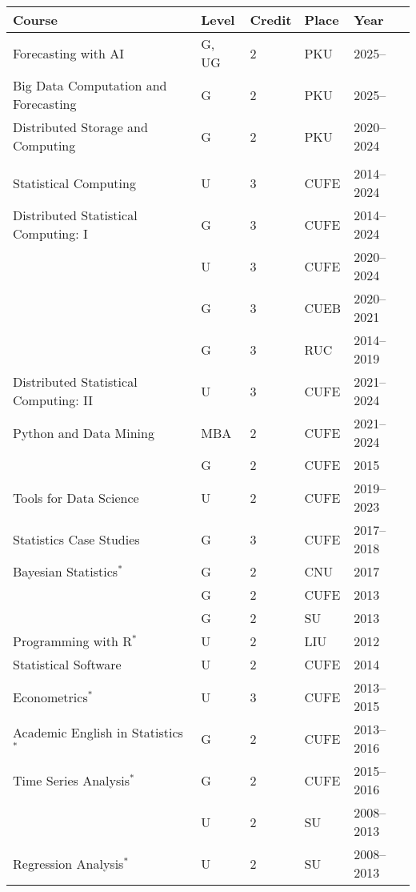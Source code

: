 \documentclass[twoside,a4paper]{article}
\begin{document}
\begin{center}
  \begin{tabular}{p{7.5cm}llll}
    \toprule
    Course                                & Level & Credit & Place & Year       \\
    \midrule
    Forecasting with AI                   & G, UG & 2      & PKU   & 2025--     \\
    Big Data Computation and Forecasting  & G     & 2      & PKU   & 2025--     \\
    Distributed Storage and Computing     & G     & 2      & PKU   & 2020--2024 \\
                                          &       &        &       &            \\
    Statistical Computing                 & U     & 3      & CUFE  & 2014--2024 \\
    Distributed Statistical Computing: I  & G     & 3      & CUFE  & 2014--2024 \\
                                          & U     & 3      & CUFE  & 2020--2024 \\
                                          & G     & 3      & CUEB  & 2020--2021 \\
                                          & G     & 3      & RUC   & 2014--2019 \\
    Distributed Statistical Computing: II & U     & 3      & CUFE  & 2021--2024 \\
    Python and Data Mining                & MBA   & 2      & CUFE  & 2021--2024 \\
                                          & G     & 2      & CUFE  & 2015       \\
    Tools for Data Science                & U     & 2      & CUFE  & 2019--2023 \\
    Statistics Case Studies               & G     & 3      & CUFE  & 2017--2018 \\
    Bayesian Statistics$^*$               & G     & 2      & CNU   & 2017       \\
                                          & G     & 2      & CUFE  & 2013       \\
                                          & G     & 2      & SU    & 2013       \\
    Programming with R$^*$                & U     & 2      & LIU   & 2012       \\
    Statistical Software                  & U     & 2      & CUFE  & 2014       \\
    Econometrics$^*$                      & U     & 3      & CUFE  & 2013--2015 \\
    Academic English in Statistics$^*$    & G     & 2      & CUFE  & 2013--2016 \\
    Time Series Analysis$^*$              & G     & 2      & CUFE  & 2015--2016 \\
                                          & U     & 2      & SU    & 2008--2013 \\
    Regression Analysis$^*$               & U     & 2      & SU    & 2008--2013 \\
    \bottomrule
  \end{tabular}
\end{center}
\end{document}

